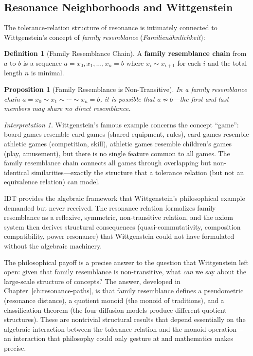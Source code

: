 \documentclass[11pt,openany]{book}
\theoremstyle{definition}
\newtheorem{definition}[axiom]{Definition}
\theoremstyle{plain}
\newtheorem{proposition}[axiom]{Proposition}
\theoremstyle{remark}
\newtheorem{interpretation}[axiom]{Interpretation}
\newcommand{\res}{\sim}                      %
\begin{document}
\subsection{Resonance Neighborhoods and Wittgenstein}

The tolerance-relation structure of resonance is intimately connected to Wittgenstein's concept of \emph{family resemblance} (\textit{Familien\"ahnlichkeit}):

\begin{definition}[Family Resemblance Chain]
A \textbf{family resemblance chain} from $a$ to $b$ is a sequence $a = x_0, x_1, \ldots, x_n = b$ where $x_i \res x_{i+1}$ for each $i$ and the total length $n$ is minimal.
\end{definition}

\begin{proposition}[Family Resemblance is Non-Transitive]
In a family resemblance chain $a = x_0 \res x_1 \res \cdots \res x_n = b$, it is possible that $a \not\res b$---the first and last members may share no direct resemblance.
\end{proposition}

\begin{interpretation}
Wittgenstein's famous example concerns the concept ``game'': board games resemble card games (shared equipment, rules), card games resemble athletic games (competition, skill), athletic games resemble children's games (play, amusement), but there is no single feature common to all games. The family resemblance chain connects all games through overlapping but non-identical similarities---exactly the structure that a tolerance relation (but not an equivalence relation) can model.

IDT provides the algebraic framework that Wittgenstein's philosophical example demanded but never received. The resonance relation formalizes family resemblance as a reflexive, symmetric, non-transitive relation, and the axiom system then derives structural consequences (quasi-commutativity, composition compatibility, power resonance) that Wittgenstein could not have formulated without the algebraic machinery.

The philosophical payoff is a precise answer to the question that Wittgenstein left open: given that family resemblance is non-transitive, what \emph{can} we say about the large-scale structure of concepts? The answer, developed in Chapter~\ref{ch:resonance-paths}, is that family resemblance defines a pseudometric (resonance distance), a quotient monoid (the monoid of traditions), and a classification theorem (the four diffusion models produce different quotient structures). These are nontrivial structural results that depend essentially on the algebraic interaction between the tolerance relation and the monoid operation---an interaction that philosophy could only gesture at and mathematics makes precise.
\end{interpretation}
\end{document}
